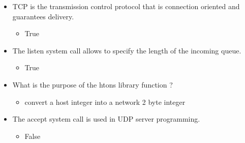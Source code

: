 \documentclass{report}
\begin{document}
\begin{itemize}
\begin{itemize}
            \end{itemize}
        \item TCP is the transmission control protocol that is connection oriented and guarantees delivery.
            \begin{itemize}
                \item True
            \end{itemize}
    \item The listen system call allows to specify the length of the incoming queue.
        \begin{itemize}
            \item True
        \end{itemize}
    \item What is the purpose of the htons library function ?
        \begin{itemize}
            \item  convert a host integer into a network 2 byte integer
        \end{itemize}
    \item The accept system call is used in UDP server programming.
        \begin{itemize}
            \item False
        \end{itemize}

    \end{itemize}
\end{document}
